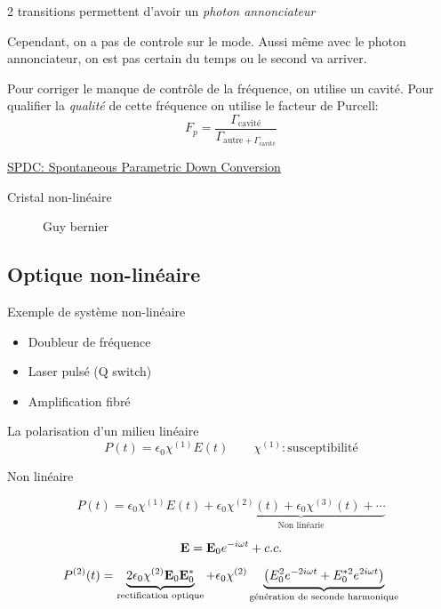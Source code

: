 2 transitions permettent d'avoir un \textit{photon annonciateur}

Cependant, on a pas de controle sur le mode. Aussi même avec le photon annonciateur, on est pas certain du temps ou le second va arriver.

Pour corriger le manque de contrôle de la fréquence, on utilise un cavité. Pour qualifier la \textit{qualité} de cette fréquence on utilise le facteur de Purcell: $$F_p = \frac{\Gamma_{\text{cavité}} }{\Gamma_{\text{autre} + \Gamma_{\text{cavité}} } } $$ 


\underline{SPDC: Spontaneous Parametric Down Conversion} 



Cristal non-linéaire 


\begin{figure}[ht]
    \centering
    \caption{Guy bernier}
    \label{fig:guy-bernier}
\end{figure}

\setcounter{subsection}{2}


\subsection{Optique non-linéaire}

Exemple de système non-linéaire
\begin{itemize}
	\item Doubleur de fréquence
	\item Laser pulsé (Q switch)
	\item Amplification fibré 
\end{itemize}


La polarisation d'un milieu linéaire $$P(t) = \epsilon_0 \chi^{(1)} E(t) \qquad \chi^{(1)}: \text{susceptibilité} $$ 

Non linéaire

$$P(t)= \epsilon_0 \chi^{(1)} E(t) + \underbrace{\epsilon_0 \chi^{(2)}(t) + \epsilon_0 \chi^{(3)}(t) + \dotsb}_{\text{Non linéarie} } $$ 



$$\vb{E} = \vb{E}_0 e^{-i\omega t } + c.c. $$ 

$$P^{(2)}(t) = \underbrace{2\epsilon_0 \chi^{(2)} \vb{E}_0 \vb{E}_0^* }_{\text{rectification optique} } + \epsilon_0\chi^{(2)} \underbrace{\left( E_0^{2}e^{-2 i \omega t}+ E_0^{*2}e^{2i\omega t} \right)}_{\text{génération de seconde harmonique} }  $$ 






